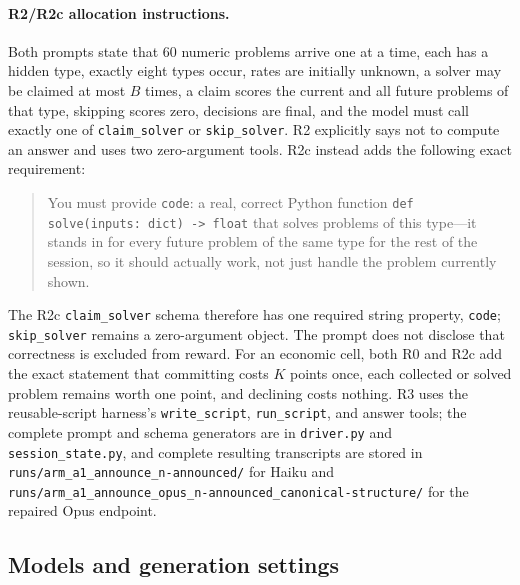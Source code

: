 \documentclass{article}
\begin{document}
\paragraph{R2/R2c allocation instructions.}
Both prompts state that 60 numeric problems arrive one at a time, each has a
hidden type, exactly eight types occur, rates are initially unknown, a solver
may be claimed at most $B$ times, a claim scores the current and all future
problems of that type, skipping scores zero, decisions are final, and the model
must call exactly one of \texttt{claim\_solver} or \texttt{skip\_solver}.
R2 explicitly says not to compute an answer and uses two zero-argument tools.
R2c instead adds the following exact requirement:
\begin{quote}\small
You must provide \texttt{code}: a real, correct Python function
\texttt{def solve(inputs: dict) -> float} that solves problems of this type---it
stands in for every future problem of the same type for the rest of the
session, so it should actually work, not just handle the problem currently
shown.
\end{quote}
The R2c \texttt{claim\_solver} schema therefore has one required string
property, \texttt{code}; \texttt{skip\_solver} remains a zero-argument object.
The prompt does not disclose that correctness is excluded from reward. For an
economic cell, both R0 and R2c add the exact statement that committing costs
$K$ points once, each collected or solved problem remains worth one point, and
declining costs nothing. R3 uses the reusable-script harness's
\texttt{write\_script}, \texttt{run\_script}, and answer tools; the complete
prompt and schema generators are in \texttt{driver.py} and
\texttt{session\_state.py}, and complete resulting transcripts are stored in
\texttt{runs/arm\_a1\_announce\_n-announced/} for Haiku and
\texttt{runs/arm\_a1\_announce\_opus\_n-announced\_canonical-structure/}
for the repaired Opus endpoint.

\subsection{Models and generation settings}
\end{document}
